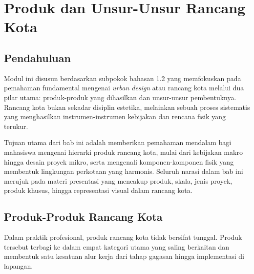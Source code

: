 \documentclass[../rumukota.tex]{subfiles}
\begin{document}
\section{Produk dan Unsur-Unsur Rancang Kota}

\subsection{Pendahuluan}
Modul ini disusun berdasarkan subpokok bahasan 1.2 yang memfokuskan pada pemahaman fundamental mengenai \textit{urban design} atau rancang kota melalui dua pilar utama: produk-produk yang dihasilkan dan unsur-unsur pembentuknya. Rancang kota bukan sekadar disiplin estetika, melainkan sebuah proses sistematis yang menghasilkan instrumen-instrumen kebijakan dan rencana fisik yang terukur.

Tujuan utama dari bab ini adalah memberikan pemahaman mendalam bagi mahasiswa mengenai hierarki produk rancang kota, mulai dari kebijakan makro hingga desain proyek mikro, serta mengenali komponen-komponen fisik yang membentuk lingkungan perkotaan yang harmonis. Seluruh narasi dalam bab ini merujuk pada materi presentasi yang mencakup produk, skala, jenis proyek, produk khusus, hingga representasi visual dalam rancang kota.

\subsection{Produk-Produk Rancang Kota}
Dalam praktik profesional, produk rancang kota tidak bersifat tunggal. Produk tersebut terbagi ke dalam empat kategori utama yang saling berkaitan dan membentuk satu kesatuan alur kerja dari tahap gagasan hingga implementasi di lapangan.
\end{document}
